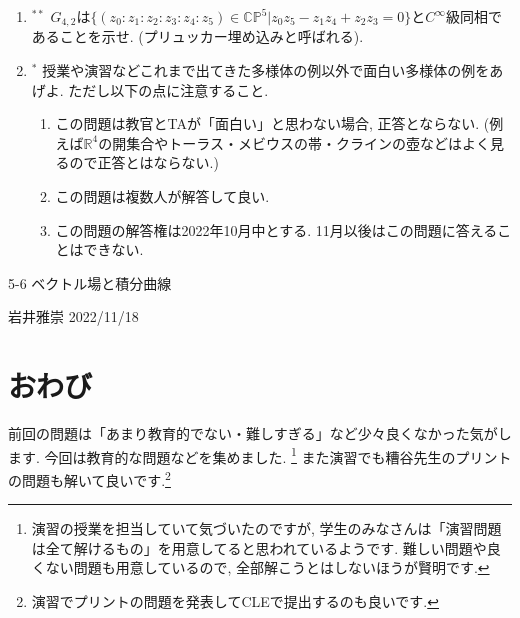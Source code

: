 \documentclass[dvipdfmx,a4paper,11pt]{article}
\newcommand{\R}{\mathbb{R}}
\newcommand{\C}{\mathbb{C}}
\theoremstyle{definition}
\begin{document}
\begin{enumerate}[label=\textbf{問}1.\arabic*]
\item $^{**}$ $G_{4,2}$は$\{ (z_0:z_1:z_2:z_3:z_4:z_5) \in  \C\mathbb{P}^{5}| z_0z_5 - z_1z_4 + z_2z_3 =0\}$と$C^{\infty}$級同相であることを示せ. (プリュッカー埋め込みと呼ばれる).



\item$^{*}$ 授業や演習などこれまで出てきた多様体の例以外で面白い多様体の例をあげよ. ただし以下の点に注意すること.
	\begin{enumerate}
	\item この問題は教官とTAが「面白い」と思わない場合, 正答とならない. (例えば$\R^4$の開集合やトーラス・メビウスの帯・クラインの壺などはよく見るので正答とはならない.)
	\item この問題は複数人が解答して良い.
	\item この問題の解答権は2022年10月中とする. 11月以後はこの問題に答えることはできない. 
	\end{enumerate}

	


\end{enumerate}

\newpage 



\begin{center}
{\Large 5-6 ベクトル場と積分曲線}
\end{center}
\begin{flushright}
 岩井雅崇 2022/11/18
\end{flushright}

\section{おわび}
前回の問題は「あまり教育的でない・難しすぎる」など少々良くなかった気がします. 今回は教育的な問題などを集めました. \footnote{演習の授業を担当していて気づいたのですが, 学生のみなさんは「演習問題は全て解けるもの」を用意してると思われているようです. 難しい問題や良くない問題も用意しているので, 全部解こうとはしないほうが賢明です.}
また演習でも糟谷先生のプリントの問題も解いて良いです.\footnote{演習でプリントの問題を発表してCLEで提出するのも良いです.}
\end{document}
